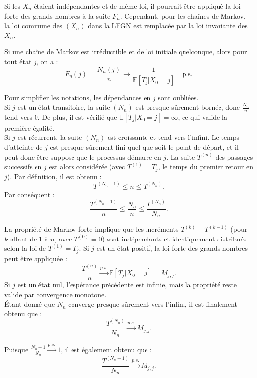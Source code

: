 \begin{sloppypar}
Si les $X_n$ étaient indépendantes et de même loi, il pourrait être appliqué la loi forte des grands nombres à la suite $F_n$. Cependant, pour les chaînes de Markov, la loi commune des $(X_n)$ dans la LFGN est remplacée par la loi invariante des $X_n$.\\

\begin{tcolorbox}[colback=blue!5!white,colframe=blue!75!black,title=Définition]
Si une chaîne de Markov est irréductible et de loi initiale quelconque, alors pour tout état $j$, on a :
\[
F_n(j) = \frac{N_n(j)}{n} \longrightarrow \frac{1}{\mathbb{E}[T_j|X_0 = j]} \quad \text{p.s.}
\]
\end{tcolorbox}

Pour simplifier les notations, les dépendances en $j$ sont oubliées.\\

Si $j$ est un état transitoire, la suite $(N_n)$ est presque sûrement bornée, donc $\frac{N_n}{n}$ tend vers $0$. De plus, il est vérifié que $\mathbb{E}[T_j | X_0 = j] = \infty$, ce qui valide la première égalité.\\

Si $j$ est récurrent, la suite $(N_n)$ est croissante et tend vers l’infini. Le temps d’atteinte de $j$ est presque sûrement fini quel que soit le point de départ, et il peut donc être supposé que le processus démarre en $j$. La suite $T^{(n)}$ des passages successifs en $j$ est alors considérée (avec $T^{(1)} = T_j$, le temps du premier retour en $j$). Par définition, il est obtenu :
\[
T^{(N_n-1)} \leq n \leq T^{(N_n)}.
\]
Par conséquent :
\[
\frac{T^{(N_n-1)}}{n} \leq \frac{N_n}{n} \leq \frac{T^{(N_n)}}{N_n}.
\]

La propriété de Markov forte implique que les incréments $T^{(k)} - T^{(k-1)}$ (pour $k$ allant de $1$ à $n$, avec $T^{(0)} = 0$) sont indépendants et identiquement distribués selon la loi de $T^{(1)} = T_j$. Si $j$ est un état positif, la loi forte des grands nombres peut être appliquée : 
\[
\frac{T^{(n)}}{n} \xrightarrow{p.s.} \mathbb{E}[T_j | X_0 = j] = M_{j,j}.
\]
Si $j$ est un état nul, l’espérance précédente est infinie, mais la propriété reste valide par convergence monotone.\\

Étant donné que $N_n$ converge presque sûrement vers l’infini, il est finalement obtenu que :
\[
\frac{T^{(N_n)}}{N_n} \xrightarrow{p.s.} M_{j,j}.
\]

Puisque $\frac{N_n - 1}{N_n} \xrightarrow{p.s.} 1$, il est également obtenu que :
\[
\frac{T^{(N_n-1)}}{N_n} \xrightarrow{p.s.} M_{j,j}.
\]


\end{sloppypar}
